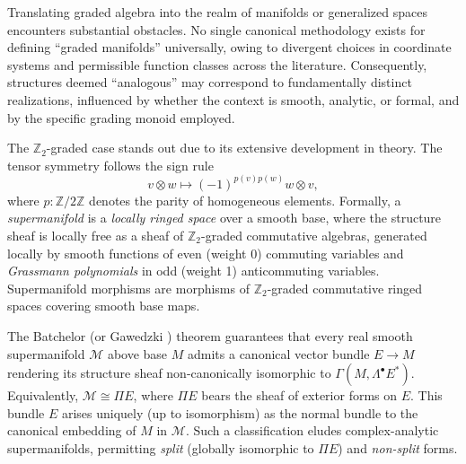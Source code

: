 \documentclass[a4paper,12pt]{amsart}
\begin{document}
\smallskip\noindent Translating graded algebra into the realm of manifolds or generalized spaces encounters substantial obstacles. No single canonical methodology exists for defining ``graded manifolds'' universally, owing to divergent choices in coordinate systems and permissible function classes across the literature. Consequently, structures deemed ``analogous'' may correspond to fundamentally distinct realizations, influenced by whether the context is smooth, analytic, or formal, and by the specific grading monoid employed.


\smallskip\noindent The $\mathbb{Z}_2$-graded case stands out due to its extensive development in theory. The tensor symmetry follows the sign rule
\[
v \otimes w \mapsto (-1)^{p(v)p(w)} w \otimes v,
\]
where $p: \mathbb{Z}/2\mathbb{Z}$ denotes the parity of homogeneous elements. Formally, a \emph{supermanifold} \cite{Berezin1966,Leites1977} is a \emph{locally ringed space} over a smooth base, where the structure sheaf  is locally free as a sheaf of $\mathbb{Z}_2$-graded commutative algebras, generated locally by smooth functions of even (weight 0) commuting variables and \emph{Grassmann polynomials} in odd (weight 1) anticommuting variables.
Supermanifold morphisms are morphisms of $\mathbb{Z}_2$-graded commutative ringed spaces covering smooth base maps.



\smallskip\noindent The Batchelor \cite{Batchelor1979} (or Gawedzki \cite{Gawedzki1977}) theorem  guarantees that every real smooth supermanifold $\mathcal{M}$ above base $M$ admits a canonical vector bundle $E \to M$ rendering its structure sheaf non-canonically isomorphic to $\Gamma(M, \Lambda^\bullet E^*)$. Equivalently, $\mathcal{M} \cong \Pi E$, where $\Pi E$ bears the sheaf of exterior forms on $E$.
This bundle $E$ arises uniquely (up to isomorphism) as the normal bundle to the canonical embedding of $M$ in $\mathcal{M}$. Such a classification eludes complex-analytic supermanifolds, permitting \emph{split} (globally isomorphic to $\Pi E$) and \emph{non-split} forms.
\end{document}
